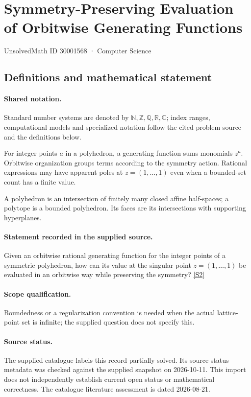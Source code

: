 \documentclass[11pt]{article}
\newcommand{\sref}[2]{\hyperlink{source:#1:#2}{[S#2]}}
\begin{document}
\setcounter{section}{30001567}
\section{Symmetry-Preserving Evaluation of Orbitwise Generating Functions}\label{30001568}
{\small\sffamily UnsolvedMath ID 30001568 · Computer Science}
\subsection{Definitions and mathematical statement}

\paragraph{Shared notation.}Standard number systems are denoted by $\mathbb N,\mathbb Z,\mathbb Q,\mathbb R,\mathbb C$; index ranges, computational models and specialized notation follow the cited problem source and the definitions below.


For integer points $a$ in a polyhedron, a generating function sums monomials $z^a$. Orbitwise organization groups terms according to the symmetry action. Rational expressions may have apparent poles at $z=(1,\ldots,1)$ even when a bounded-set count has a finite value.

A polyhedron is an intersection of finitely many closed affine half-spaces; a polytope is a bounded polyhedron. Its faces are its intersections with supporting hyperplanes.
\paragraph{Statement recorded in the supplied source.}
Given an orbitwise rational generating function for the integer points of a symmetric polyhedron, how can its value at the singular point $z=(1,\ldots,1)$ be evaluated in an orbitwise way while preserving the symmetry? \sref{30001568}{2}
\paragraph{Scope qualification.}
Boundedness or a regularization convention is needed when the actual lattice-point set is infinite; the supplied question does not specify this.
\paragraph{Source status.}
The supplied catalogue labels this record partially solved. Its source-status metadata was checked against the supplied snapshot on 2026-10-11. This import does not independently establish current open status or mathematical correctness. The catalogue literature assessment is dated 2026-08-21.
\end{document}
